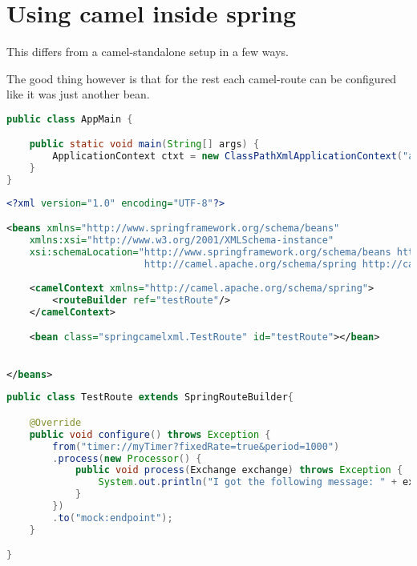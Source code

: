 \section{Using camel inside spring}

This differs from a camel-standalone setup in a few ways. 

The good thing however is that for the rest each camel-route can be configured like it was just another bean. 



\begin{lstlisting}[language=java, name=AppMain.java]
public class AppMain {

	public static void main(String[] args) {
		ApplicationContext ctxt = new ClassPathXmlApplicationContext("app.xml");
	}
}
\end{lstlisting}

\begin{lstlisting}[language=xml, name=app.xml]
<?xml version="1.0" encoding="UTF-8"?>

<beans xmlns="http://www.springframework.org/schema/beans"
	xmlns:xsi="http://www.w3.org/2001/XMLSchema-instance"
	xsi:schemaLocation="http://www.springframework.org/schema/beans http://www.springframework.org/schema/beans/spring-beans.xsd
						http://camel.apache.org/schema/spring http://camel.apache.org/schema/spring/camel-spring.xsd">
	
	<camelContext xmlns="http://camel.apache.org/schema/spring">
		<routeBuilder ref="testRoute"/>
	</camelContext>

	<bean class="springcamelxml.TestRoute" id="testRoute"></bean>
	

</beans>
\end{lstlisting}

\begin{lstlisting}[language=java, name=TestRoute.java]
public class TestRoute extends SpringRouteBuilder{

	@Override
	public void configure() throws Exception {
		from("timer://myTimer?fixedRate=true&period=1000")
		.process(new Processor() {
			public void process(Exchange exchange) throws Exception {
				System.out.println("I got the following message: " + exchange.getIn());
			}
		})
		.to("mock:endpoint");
	}

}
\end{lstlisting}


